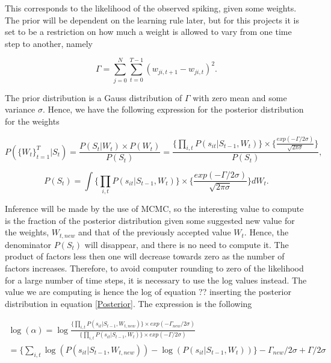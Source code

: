 This corresponds to the likelihood of the observed spiking, given some weights. The prior will be dependent on the learning rule later, but for this projects it is set to be a restriction on how much a weight is allowed to vary from one time step to another, namely

\begin{equation}
    \Gamma = \sum_{j=0}^{N} \sum_{t=0}^{T-1} (w_{ji,t+1}-w_{ji,t})^2.
\end{equation}

The prior distribution is a Gauss distribution of $\Gamma$ with zero mean and some variance $\sigma$. Hence, we have the following expression for the posterior distribution for the weights

\begin{equation}
\label{Posterior}
        P(\{W_t\}_{t=1}^{T}|S_t) = \frac{P(S_t|W_t)\times P(W_t)}{P(S_t)} = \frac{\Big\{\prod_{i,t} P(s_{it}|S_{t-1}, W_t)\Big\} \times \Big\{\frac{exp(-\Gamma /2\sigma)}{\sqrt{2\pi \sigma}}\Big\}}{P(S_t)}, 
\end{equation}

\begin{equation}
        P(S_t) = \int \Big\{\prod_{i,t} P(s_{it}|S_{t-1}, W_t)\Big\} \times \Big\{\frac{exp(-\Gamma /2\sigma)}{\sqrt{2\pi \sigma}}\Big\} d{W_t}.
\end{equation}

Inference will be made by the use of MCMC, so the interesting value to compute is the fraction of the posterior distribution given some suggested new value for the weights, $W_{t, new}$ and that of the previously accepted value $W_t$. Hence, the denominator $P(S_t)$ will disappear, and there is no need to compute it. The product of factors less then one will decrease towards zero as the number of factors increases. Therefore, to avoid computer rounding to zero of the likelihood for a large number of time steps, it is necessary to use the log values instead. The value we are computing is hence the log of equation ??  inserting the posterior distribution in equation \ref{Posterior}. The expression is the following

\begin{equation}
\label{eq:ratio}
\begin{split}
    \log (\alpha) = 
    \log \frac{\big \{ \prod_{i,t} P(s_{it}|S_{t-1}, W_{t,new})\big \} \times exp(-\Gamma_{new} /2\sigma)}{\big \{ \prod_{i,t}  P(s_{it}|S_{t-1}, W_t) \big \} \times exp(-\Gamma /2\sigma)} \\
    = \Big \{ \sum_{i,t} \log( P(s_{it}|S_{t-1}, W_{t,new})) - \log( P(s_{it}|S_{t-1}, W_t)) \Big \} -\Gamma_{new} /2\sigma +  \Gamma /2\sigma
\end{split}
\end{equation}


